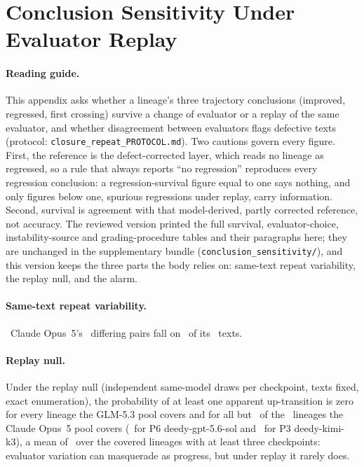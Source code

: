 \clearpage
\section{Conclusion Sensitivity Under Evaluator Replay}
\label{app:sens}
\paragraph{Reading guide.} This appendix asks whether a lineage's three trajectory conclusions (improved, regressed, first crossing) survive a change of evaluator or a replay of the same evaluator, and whether disagreement between evaluators flags defective texts (protocol: \texttt{closure\_repeat\_PROTOCOL.md}). Two cautions govern every figure. First, the reference is the defect-corrected layer, which reads no lineage as regressed, so a rule that always reports ``no regression'' reproduces every regression conclusion: a regression-survival figure equal to one says nothing, and only figures below one, spurious regressions under replay, carry information. Second, survival is agreement with that model-derived, partly corrected reference, not accuracy. The reviewed version printed the full survival, evaluator-choice, instability-source and grading-procedure tables and their paragraphs here; they are unchanged in the supplementary bundle (\texttt{conclusion\_sensitivity/\allowbreak }), and this version keeps the three parts the body relies on: same-text repeat variability, the replay null, and the alarm.

\paragraph{Same-text repeat variability.} \REPLAYQTXT\ Claude Opus~5's \CRBodyRepeatDiffer\ differing pairs fall on \CRBodyRepeatVarTexts\ of its \CRBodyRepeatTexts\ texts.

\paragraph{Replay null.} Under the replay null (independent same-model draws per checkpoint, texts fixed, exact enumeration), the probability of at least one apparent up-transition is zero for every lineage the GLM-5.3 pool covers and for all but \CRReplayNonzero\ of the \CRReplayCovered\ lineages the Claude Opus~5 pool covers (\CRReplayTop\ for P6 deedy-gpt-5.6-sol and \CRReplaySecond\ for P3 deedy-kimi-k3), a mean of \CRReplayMean\ over the covered lineages with at least three checkpoints: evaluator variation can masquerade as progress, but under replay it rarely does.

